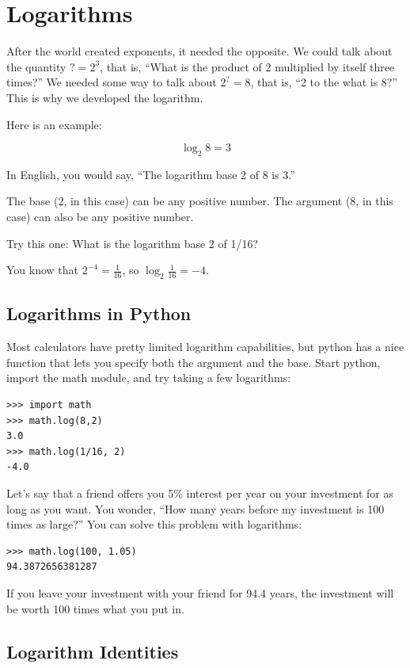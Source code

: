 \chapter{Logarithms}

After the world created exponents, it needed the opposite. We
could talk about the quantity $? = 2^3$, that is, ``What is the
product of 2 multiplied by itself three times?''  We needed some way
to talk about $2^? = 8$, that is, ``2 to the what is 8?'' This is why we
developed the logarithm. 

Here is an example:

$$\log_{2}8 = 3$$

In English, you would say, ``The logarithm base 2 of 8 is 3.''

The base (2, in this case) can be any positive number. The argument
(8, in this case) can also be any positive number.

Try this one: What is the logarithm base 2 of 1/16?

You know that $2^{-4} = \frac{1}{16}$, so $\log_{2} \frac{1}{16} = -4$.

\section{Logarithms in Python}

Most calculators have pretty limited logarithm capabilities, but
python has a nice  function that lets you specify both
the argument and the base. Start python, import the math module, and try taking a few logarithms:

\begin{verbatim}
>>> import math
>>> math.log(8,2)
3.0
>>> math.log(1/16, 2)
-4.0
\end{verbatim}

Let's say that a friend offers you 5\% interest per year on your
investment for as long as you want. You wonder, ``How many years
before my investment is 100 times as large?'' You can solve this problem with logarithms:

\begin{verbatim}
>>> math.log(100, 1.05)
94.3872656381287
\end{verbatim}

If you leave your investment with your friend for 94.4 years, the
investment will be worth 100 times what you put in.

\section{Logarithm Identities}

